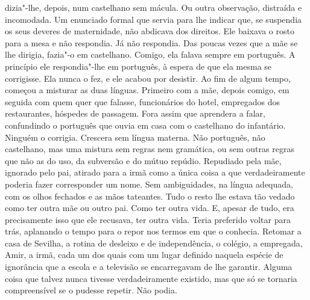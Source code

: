 dizia"-lhe, depois, num castelhano sem mácula. Ou outra observação,
distraída e incomodada. Um enunciado formal que servia para lhe indicar
que, se suspendia os seus deveres de maternidade, não abdicava dos
direitos. Ele baixava o rosto para a mesa e não respondia. Já não
respondia. Das poucas vezes que a mãe se lhe dirigia, fazia"-o em
castelhano. Comigo, ela falava sempre em português. A princípio ele
respondia"-lhe em português, à espera de que ela mesma se corrigisse.
Ela nunca o fez, e ele acabou por desistir. Ao fim de algum tempo,
começou a misturar as duas línguas. Primeiro com a mãe, depois comigo,
em seguida com quem quer que falasse, funcionários do hotel, empregados
dos restaurantes, hóspedes de passagem. Fora assim que aprendera a
falar, confundindo o português que ouvia em casa com o castelhano do
infantário. Ninguém o corrigia. Crescera sem língua materna. Não
português, não castelhano, mas uma mistura sem regras nem gramática, ou
sem outras regras que não as do uso, da subversão e do mútuo repúdio.
Repudiado pela mãe, ignorado pelo pai, atirado para a irmã como a única
coisa a que verdadeiramente poderia fazer corresponder um nome. Sem
ambiguidades, na língua adequada, com os olhos fechados e as mãos
tateantes. Tudo o resto lhe estava tão vedado como ter outra mãe ou
outro pai. Como ter outra vida. E, apesar de tudo, era precisamente isso
que ele recusava, ter outra vida. Teria preferido voltar para trás,
aplanando o tempo para o repor nos termos em que o conhecia. Retomar a
casa de Sevilha, a rotina de desleixo e de independência, o colégio, a
empregada, Amir, a irmã, cada um dos quais com um lugar definido naquela
espécie de ignorância que a escola e a televisão se encarregavam de lhe
garantir. Alguma coisa que talvez nunca tivesse verdadeiramente
existido, mas que só se tornaria compreensível se o pudesse repetir. Não
podia.

